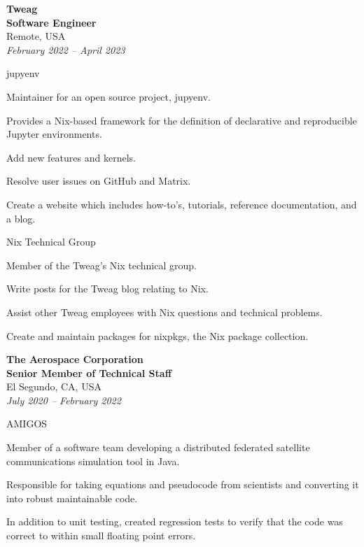 \documentclass{article}
\newcommand{\experienceInfo}[4]{
    \item
        \textbf{\large{#1}} \\
        \textbf{#2} \\
        #3 \\
        \textit{#4}
}
\newcommand{\experienceRole}[1]{
    \item #1
}
\newcommand{\experienceTask}[1]{
    \item #1
}
\begin{document}
\begin{experience}

    \experienceInfo
        {Tweag}
        {Software Engineer}
        {Remote, USA}
        {February 2022 -- April 2023}

    \begin{experience}
        \experienceRole{jupyenv}
        \begin{experience}
            \experienceTask{Maintainer for an open source project, jupyenv.}
            \experienceTask{Provides a Nix-based framework for the definition of declarative and reproducible Jupyter environments.}
            \experienceTask{Add new features and kernels.}
            \experienceTask{Resolve user issues on GitHub and Matrix.}
            \experienceTask{Create a website which includes how-to’s, tutorials, reference documentation, and a blog.}
        \end{experience}
    \end{experience}

    \begin{experience}
        \experienceRole{Nix Technical Group}
        \begin{experience}
            \experienceTask{Member of the Tweag's Nix technical group.}
            \experienceTask{Write posts for the Tweag blog relating to Nix.}
            \experienceTask{Assist other Tweag employees with Nix questions and technical problems.}
            \experienceTask{Create and maintain packages for nixpkgs, the Nix package collection.}
        \end{experience}
    \end{experience}

    \experienceInfo
        {The Aerospace Corporation}
        {Senior Member of Technical Staff}
        {El Segundo, CA, USA}
        {July 2020 -- February 2022}

    \begin{experience}
        \experienceRole{AMIGOS}
        \begin{experience}
            \experienceTask{Member of a software team developing a distributed federated satellite communications simulation tool in Java.}
            \experienceTask{Responsible for taking equations and pseudocode from scientists and converting it into robust maintainable code.}
            \experienceTask{In addition to unit testing, created regression tests to verify that the code was correct to within small floating point errors.}
        \end{experience}
    \end{experience}


\end{experience}
\end{document}
